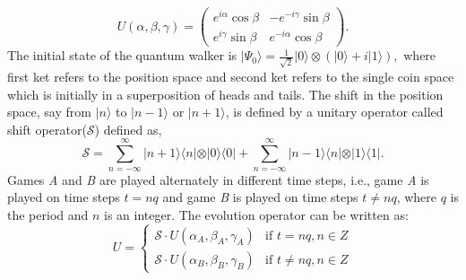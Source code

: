 \documentclass[english,aps,pra,amsmath,amssymb,showpacs,notitlepage,onecolumn]{revtex4-1}
\begin{document}
\begin{equation}
U(\alpha,\beta,\gamma)=\left(\begin{array}{cc}
e^{i\alpha}\cos\beta & -e^{-i\gamma}\sin\beta\\
e^{i\gamma}\sin\beta & e^{-i\alpha}\cos\beta
\end{array}\right).\label{eq:SU(2)}
\end{equation}
The initial state of the quantum walker is  $\vert\Psi_{0}\rangle=\frac{1}{\sqrt{2}}\vert 0\rangle\otimes(\vert 0\rangle+i\vert 1\rangle),$ where first ket refers to the position space and second ket refers to the single coin space which is initially in  a superposition of heads and tails. The shift in the position space, say from $|n\rangle$ to $|n-1\rangle$ or $|n+1\rangle$, is defined by a unitary operator called shift operator($\mathcal{S}$) defined as,
\begin{equation}
\mathcal{S} =   \sum\limits_{n=-\infty}^{\infty}\vert n+1 \rangle \langle n \vert \otimes \vert 0 \rangle \langle 0 \vert +   \sum\limits_{n=-\infty}^{\infty}\vert n-1 \rangle \langle n \vert \otimes \vert 1 \rangle \langle 1 \vert.
\label{Equ:S}
\end{equation}
 Games \emph{A} and \emph{B} are played alternately in different time steps, i.e., game \emph{A} is played on time steps
$t=nq$ and game \emph{B} is played on time steps $t\neq nq$, where $q$ is the period and $n$ is an integer. The evolution operator can be written as: 
\begin{equation}
U =\left\lbrace 
	\begin{array}{ll}
		\mathcal{S}\cdot U(\alpha_{A},\beta_{A},\gamma_{A})  & \mbox{if } t=nq,n\in Z \\
		\mathcal{S}\cdot U(\alpha_{B},\beta_{B},\gamma_{B}) & \mbox{if } t\neq nq,n\in Z
	\end{array}
\right. 
\end{equation}
\end{document}
